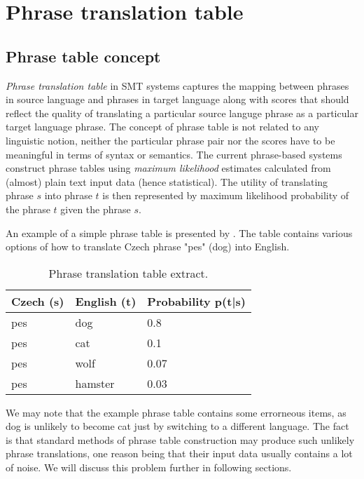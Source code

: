 \chapter{Phrase translation table}
\label{chap:phrase-table}

\section{Phrase table concept}

\emph{Phrase translation table} in SMT systems captures the mapping
between phrases in source language and phrases in target language
along with scores that should reflect the quality of translating a particular
source languge phrase as a particular target language phrase.
The concept of phrase table is not related to any linguistic notion,
neither the particular phrase pair nor the scores have to be meaningful
in terms of syntax or semantics. The current phrase-based systems construct
phrase tables using \emph{maximum likelihood} estimates calculated from (almost)
plain text input data (hence statistical). The utility of translating phrase
$s$ into phrase $t$ is then represented by maximum likelihood probability of
the phrase $t$ given the phrase $s$.

An example of a simple phrase table is presented by .
The table contains various options of how to translate Czech phrase
"pes" (dog) into English.

\begin{table}[h]
\centering
\begin{tabular}{ l l l}
Czech (s) & English (t) & Probability p(t|s) \\
\hline
\hline
pes & dog & 0.8 \\
pes & cat & 0.1 \\
pes & wolf & 0.07 \\
pes & hamster & 0.03 \\
\hline
\hline
\end{tabular}
\caption{\label{phrase-table-example}Phrase translation table extract.}
\end{table}

We may note that the example phrase table contains some errorneous items,
as dog is unlikely to become cat just by switching to a different language.
The fact is that standard methods of phrase table construction may produce such
unlikely phrase translations, one reason being that their input data usually
contains a lot of noise.
We will discuss this problem further in following sections.

